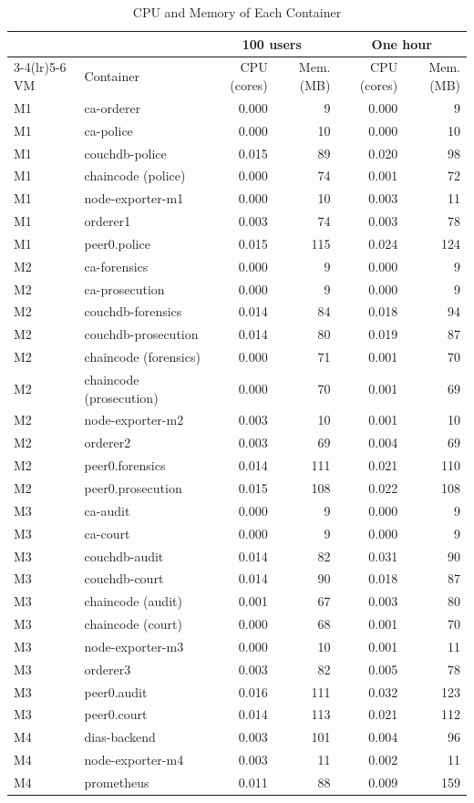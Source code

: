 \begin{table}[tb]
\centering
\caption{CPU and Memory of Each Container}
\label{tab:tb-containers}
\footnotesize
\setlength{\tabcolsep}{2.5pt}
\begin{tabular}{@{}llrrrr@{}}
\toprule
 & & \multicolumn{2}{c}{100 users} & \multicolumn{2}{c}{One hour} \\
\cmidrule(lr){3-4}\cmidrule(lr){5-6}
VM & Container & CPU (cores) & Mem. (MB) & CPU (cores) & Mem. (MB) \\
\midrule
M1 & ca-orderer & 0.000 & 9 & 0.000 & 9 \\
M1 & ca-police & 0.000 & 10 & 0.000 & 10 \\
M1 & couchdb-police & 0.015 & 89 & 0.020 & 98 \\
M1 & chaincode (police) & 0.000 & 74 & 0.001 & 72 \\
M1 & node-exporter-m1 & 0.000 & 10 & 0.003 & 11 \\
M1 & orderer1 & 0.003 & 74 & 0.003 & 78 \\
M1 & peer0.police & 0.015 & 115 & 0.024 & 124 \\
M2 & ca-forensics & 0.000 & 9 & 0.000 & 9 \\
M2 & ca-prosecution & 0.000 & 9 & 0.000 & 9 \\
M2 & couchdb-forensics & 0.014 & 84 & 0.018 & 94 \\
M2 & couchdb-prosecution & 0.014 & 80 & 0.019 & 87 \\
M2 & chaincode (forensics) & 0.000 & 71 & 0.001 & 70 \\
M2 & chaincode (prosecution) & 0.000 & 70 & 0.001 & 69 \\
M2 & node-exporter-m2 & 0.003 & 10 & 0.001 & 10 \\
M2 & orderer2 & 0.003 & 69 & 0.004 & 69 \\
M2 & peer0.forensics & 0.014 & 111 & 0.021 & 110 \\
M2 & peer0.prosecution & 0.015 & 108 & 0.022 & 108 \\
M3 & ca-audit & 0.000 & 9 & 0.000 & 9 \\
M3 & ca-court & 0.000 & 9 & 0.000 & 9 \\
M3 & couchdb-audit & 0.014 & 82 & 0.031 & 90 \\
M3 & couchdb-court & 0.014 & 90 & 0.018 & 87 \\
M3 & chaincode (audit) & 0.001 & 67 & 0.003 & 80 \\
M3 & chaincode (court) & 0.000 & 68 & 0.001 & 70 \\
M3 & node-exporter-m3 & 0.000 & 10 & 0.001 & 11 \\
M3 & orderer3 & 0.003 & 82 & 0.005 & 78 \\
M3 & peer0.audit & 0.016 & 111 & 0.032 & 123 \\
M3 & peer0.court & 0.014 & 113 & 0.021 & 112 \\
M4 & dias-backend & 0.003 & 101 & 0.004 & 96 \\
M4 & node-exporter-m4 & 0.003 & 11 & 0.002 & 11 \\
M4 & prometheus & 0.011 & 88 & 0.009 & 159 \\
\bottomrule
\end{tabular}
\end{table}

